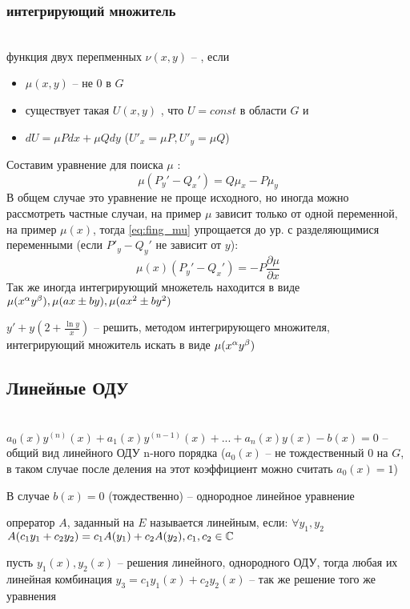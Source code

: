 \subsubsection{интегрирующий множитель}

\begin{Def}  \\
функция двух перепменных $\nu(x, y)$ --  , если
\begin{itemize}
    \item  $\mu(x, y)$ -- не 0 в $G$
    \item существует такая $U(x, y)$ , что $U = const$ в области $G$ и
    \item $dU = \mu P dx  + \mu Q dy $ ($U'_x = \mu P , U'_y = \mu Q$)
\end{itemize}
\end{Def}
Составим уравнение для поиска $\mu$ :
\begin{equation} \label{eq:fing_mu}
    \mu (P_y' - Q_x') = Q \mu_x - P \mu_y
\end{equation}
В общем случае это уравнение не проще исходного, но иногда можно рассмотреть частные случаи, на пример $\mu$ зависит только от одной переменной, на пример $\mu(x)$, тогда \eqref{eq:fing_mu} упрощается до ур. с разделяющимися переменными (если $P'_y - Q_y '$ не зависит от $y$):
\begin{equation}
    \mu(x) (P_y' - Q_x') = - P \frac{\partial \mu}{\partial x}
\end{equation}
Так же иногда интегрирующий множетель находится в виде $\mu(x^{\alpha} y^{\beta}), \mu(ax \pm by), \mu(ax^2 \pm by^2)$ 
\begin{problem}
$y' + y(2 + \frac{\ln y}{x})$ -- решить, методом интегрирующего множителя, интегрирующий множитель искать в виде $\mu(x^{\alpha} y^{\beta})$
\end{problem}

\subsection{Линейные ОДУ}
\begin{Def}  \\
$a_0(x)y^{(n)}(x) + a_1(x)y^{(n-1)}(x) + ... + a_n(x)y(x) - b(x) = 0$ -- общий вид линейного ОДУ n-ного порядка ($a_0(x)$ -- не тождественный 0 на $G$, в таком случае после деления на этот коэффициент можно считать $a_0(x) = 1$)
\end{Def}
В случае $b(x) = 0$ (тождественно) -- однородное линейное уравнение
\begin{Def} 
опрератор $A$, заданный на $E$ называется линейным, если:  $\forall y_1, y_2$  $A(c_1y_1 + c_2 y_2) = c_1A(y_1)+ c_2A(y_2), c_1, c_2 \in \mathbb{C}$
\end{Def}
\begin{theorem} 
пусть $y_1(x) , y_2(x)$ -- решения линейного, однородного ОДУ, тогда любая их линейная комбинация $y_3 = c_1 y_1(x) + c_2 y_2(x)$ -- так же решение того же уравнения
\end{theorem}

